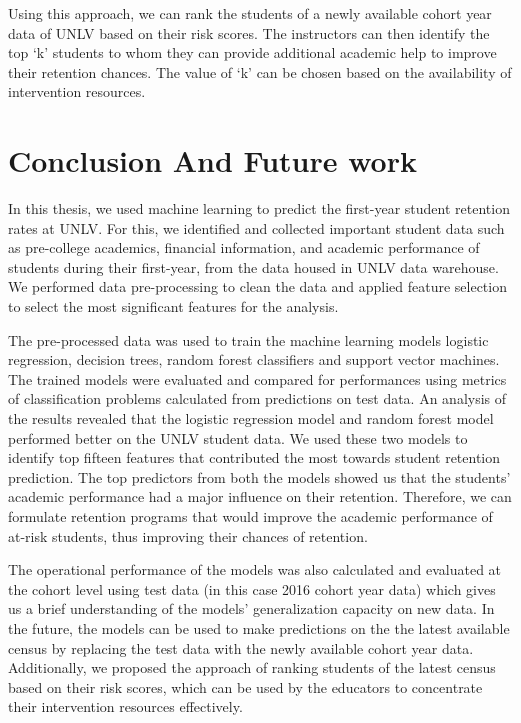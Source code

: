 \documentclass[11pt,openright]{report}
\begin{document}
Using this approach, we can rank the students of a newly available cohort year data of UNLV based on their risk scores. The instructors can then identify the top `k' students to whom they can provide additional academic help to improve their retention chances. The value of `k' can be chosen based on the availability of intervention resources.


\chapter{Conclusion And Future work} \label{chapter:conclusion}

In this thesis, we used machine learning to predict the first-year student retention rates at UNLV. For this, we identified and collected important student data such as pre-college academics, financial information, and academic performance of students during their first-year, from the data housed in UNLV data warehouse. We performed data pre-processing to clean the data and applied feature selection to select the most significant features for the analysis. 

The pre-processed data was used to train the machine learning models logistic regression, decision trees, random forest classifiers and support vector machines. The trained models were evaluated and compared for performances using metrics of classification problems calculated from predictions on test data. An analysis of the results revealed that the logistic regression model and random forest model performed better on the UNLV student data. We used these two models to identify top fifteen features that contributed the most towards student retention prediction. The top predictors from both the models showed us that the students' academic performance had a major influence on their retention. Therefore, we can formulate retention programs that would improve the academic performance of at-risk students, thus improving their chances of retention. 

The operational performance of the models was also calculated and evaluated at the cohort level using test data (in this case 2016 cohort year data) which gives us a brief understanding of the models' generalization capacity on new data. In the future, the models can be used to make predictions on the the latest available census by replacing the test data with the newly available cohort year data. Additionally, we proposed the approach of ranking students of the latest census based on their risk scores, which can be used by the educators to concentrate their intervention resources effectively.
\end{document}
